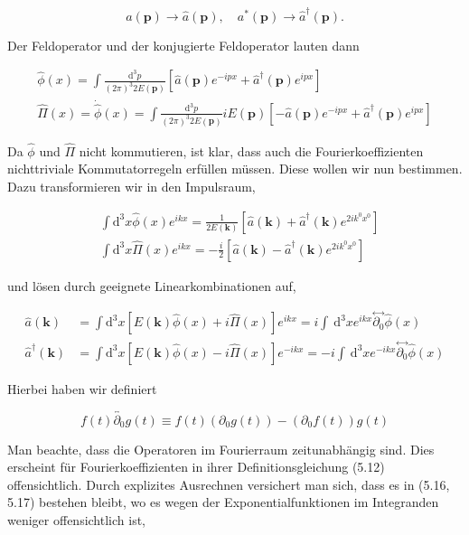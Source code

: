 \documentclass[10pt, letterpaper]{article}
\begin{document}
$$
a(\mathbf{p}) \rightarrow \hat{a}(\mathbf{p}), \quad a^{*}(\mathbf{p}) \rightarrow \hat{a}^{\dagger}(\mathbf{p}) .
$$

Der Feldoperator und der konjugierte Feldoperator lauten dann

$$
\begin{gathered}
\hat{\phi}(x)=\int \frac{\mathrm{d}^{3} p}{(2 \pi)^{3} 2 E(\mathbf{p})}\left[\hat{a}(\mathbf{p}) e^{-i p x}+\hat{a}^{\dagger}(\mathbf{p}) e^{i p x}\right] \\
\hat{\Pi}(x)=\dot{\hat{\phi}}(x)=\int \frac{\mathrm{d}^{3} p}{(2 \pi)^{3} 2 E(\mathbf{p})} i E(\mathbf{p})\left[-\hat{a}(\mathbf{p}) e^{-i p x}+\hat{a}^{\dagger}(\mathbf{p}) e^{i p x}\right]
\end{gathered}
$$

Da $\hat{\phi}$ und $\hat{\Pi}$ nicht kommutieren, ist klar, dass auch die Fourierkoeffizienten nichttriviale Kommutatorregeln erfüllen müssen. Diese wollen wir nun bestimmen. Dazu transformieren wir in den Impulsraum,

$$
\begin{aligned}
& \int \mathrm{d}^{3} x \hat{\phi}(x) e^{i k x}=\frac{1}{2 E(\mathbf{k})}\left[\hat{a}(\mathbf{k})+\hat{a}^{\dagger}(\mathbf{k}) e^{2 i k^{0} x^{0}}\right] \\
& \int \mathrm{d}^{3} x \hat{\Pi}(x) e^{i k x}=-\frac{i}{2}\left[\hat{a}(\mathbf{k})-\hat{a}^{\dagger}(\mathbf{k}) e^{2 i k^{0} x^{0}}\right]
\end{aligned}
$$

und lösen durch geeignete Linearkombinationen auf,

$$
\begin{aligned}
\hat{a}(\mathbf{k}) & =\int \mathrm{d}^{3} x[E(\mathbf{k}) \hat{\phi}(x)+i \hat{\Pi}(x)] e^{i k x}=i \int \mathrm{~d}^{3} x e^{i k x} \stackrel{\leftrightarrow}{\partial_{0}} \hat{\phi}(x) \\
\hat{a}^{\dagger}(\mathbf{k}) & =\int \mathrm{d}^{3} x[E(\mathbf{k}) \hat{\phi}(x)-i \hat{\Pi}(x)] e^{-i k x}=-i \int \mathrm{~d}^{3} x e^{-i k x} \stackrel{\leftrightarrow}{\partial_{0}} \hat{\phi}(x)
\end{aligned}
$$

Hierbei haben wir definiert

$$
f(t) \overleftrightarrow{\partial_{0}} g(t) \equiv f(t)\left(\partial_{0} g(t)\right)-\left(\partial_{0} f(t)\right) g(t)
$$

Man beachte, dass die Operatoren im Fourierraum zeitunabhängig sind. Dies erscheint für Fourierkoeffizienten in ihrer Definitionsgleichung (5.12) offensichtlich. Durch explizites Ausrechnen versichert man sich, dass es in (5.16, 5.17) bestehen bleibt, wo es wegen der Exponentialfunktionen im Integranden weniger offensichtlich ist,
\end{document}
